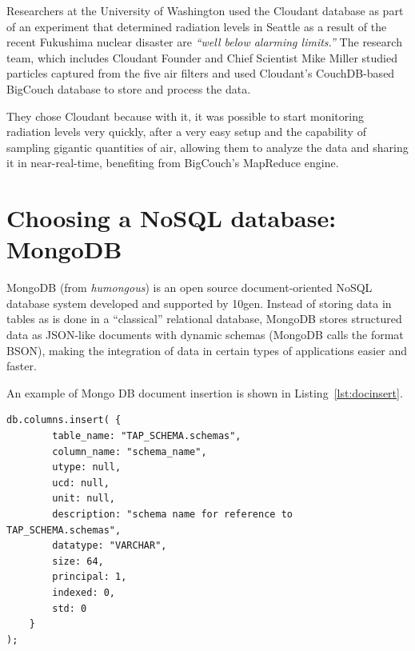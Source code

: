 Researchers at the University of Washington used the Cloudant  database as part of an experiment that determined radiation levels in Seattle as a result of the recent Fukushima nuclear disaster are \emph{``well below alarming limits.''} The research team, which includes Cloudant Founder and Chief Scientist Mike Miller studied particles captured from the five air filters and used Cloudant’s CouchDB-based BigCouch database to store and process the data.

They chose Cloudant because with it, it was possible to start monitoring radiation levels very quickly, after a very easy setup and the capability of sampling gigantic quantities of air, allowing them to analyze the data and sharing it in near-real-time,
benefiting from BigCouch's MapReduce engine.





\section{Choosing a NoSQL database: MongoDB} %
\label{sec:mongodb_a_document_oriented_database}

MongoDB (from \emph{humongous}) is an open source document-oriented
NoSQL
database system developed and supported by 10gen.
Instead of storing data in tables as is done in a ``classical'' relational database, MongoDB stores structured data as JSON-like documents with dynamic schemas (MongoDB calls the format BSON), making the integration of data in certain types of applications easier and faster. 

An example of Mongo DB document insertion is shown in Listing~\ref{lst:docinsert}.

\begin{lstlisting}[float,label=lst:docinsert,caption=MongoDB column insertion example in JSON]
db.columns.insert( {
		table_name: "TAP_SCHEMA.schemas",
		column_name: "schema_name",
		utype: null,
		ucd: null,
		unit: null,
		description: "schema name for reference to TAP_SCHEMA.schemas",
		datatype: "VARCHAR",
		size: 64,
		principal: 1,
		indexed: 0,
		std: 0
	}
);
\end{lstlisting} 


